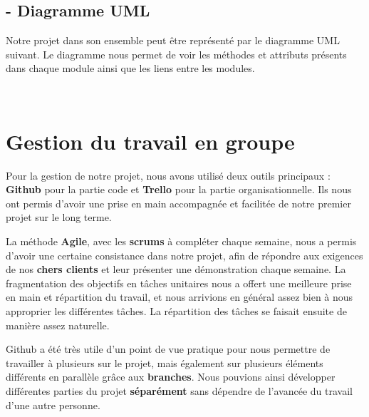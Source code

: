 \documentclass[12pt]{article}
\begin{document}
\subsection*{- Diagramme UML}
\hspace{\parindent}Notre projet dans son ensemble peut être représenté par le diagramme UML suivant. Le diagramme nous permet de voir les méthodes et attributs présents dans chaque module ainsi que les liens entre les modules. \\

\begin{landscape}

\end{landscape}
\\

\clearpage
\section*{Gestion du travail en groupe}

\hspace{\parindent}Pour la gestion de notre projet, nous avons utilisé deux outils principaux : \textbf{Github} pour la partie code et \textbf{Trello }pour la partie organisationnelle. Ils nous ont permis d’avoir une prise en main accompagnée et facilitée de notre premier projet sur le long terme. 

\hspace{\parindent}La méthode\textbf{ Agile}, avec les \textbf{scrums} à compléter chaque semaine, nous a permis d’avoir une certaine consistance dans notre projet, afin de répondre aux exigences de nos \textbf{chers clients} et leur présenter une démonstration chaque semaine. La fragmentation des objectifs en tâches unitaires nous a offert une meilleure prise en main et répartition du travail, et nous arrivions en général assez bien à nous approprier les différentes tâches. La répartition des tâches se faisait ensuite de manière assez naturelle.

\hspace{\parindent} Github a été très utile d’un point de vue pratique pour nous permettre de travailler à plusieurs sur le projet, mais également sur plusieurs éléments différents en parallèle grâce aux \textbf{branches}. Nous pouvions ainsi développer différentes parties du projet \textbf{séparément} sans dépendre de l’avancée du travail d’une autre personne.
\end{document}
